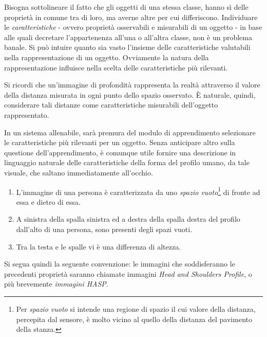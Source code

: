             Bisogna sottolineare il fatto che gli oggetti di una stessa classe, hanno sì delle proprietà in comune tra di loro, ma averne altre per cui differiscono.
            Individuare le \emph{caratteristiche} - ovvero proprietà osservabili e misurabili di un oggetto - in base alle quali decretare l'appartenenza all'una o all'altra classe, non è un problema banale.
            Si può intuire quanto sia vasto l'insieme delle caratteristiche valutabili nella rappresentazione di un oggetto.
            Ovviamente la natura della rappresentazione influisce nella scelta delle caratteristiche più rilevanti.
            
            Si ricordi che un'immagine di profondità rappresenta la realtà attraverso il valore della distanza misurata in ogni punto dello spazio osservato. 
            È naturale, quindi, considerare tali distanze come caratteristiche misurabili dell'oggetto rappresentato.

            In un sistema allenabile, sarà premura del modulo di apprendimento selezionare le caratteristiche più rilevanti per un oggetto.
            Senza anticipare altro sulla questione dell'apprendimento, è comunque utile fornire una descrizione in linguaggio naturale delle caratteristiche della forma del profilo umano, da tale visuale, che saltano immediatamente all'occhio.

            \begin{enumerate}
                \item L'immagine di una persona è caratterizzata da uno \emph{spazio vuoto}\footnote{Per \emph{spazio vuoto} si intende una regione di spazio il cui valore della distanza, percepita dal sensore, è molto vicino al quello della distanza del pavimento della stanza.} di fronte ad essa e dietro di essa.

                \item A sinistra della spalla sinistra ed a destra della spalla destra del profilo dall'alto di una persona, sono presenti degli spazi vuoti.
                
                \item Tra la testa e le spalle vi è una differenza di altezza.
            \end{enumerate}

            Si segua quindi la seguente convenzione: le immagini che soddisferanno le precedenti proprietà saranno chiamate immagini \emph{Head and Shoulders Profile}, o più brevemente \emph{immagini HASP}.

